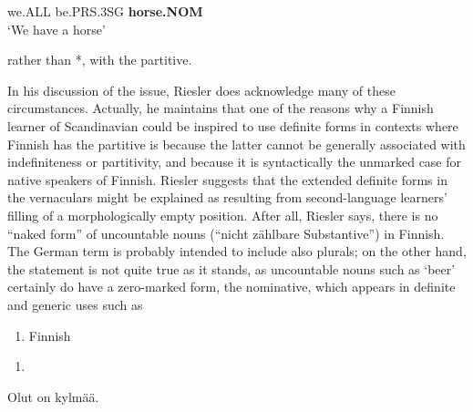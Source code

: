 we.ALL  be.PRS.3SG  \textbf{horse.NOM} \\ %


‘We have a horse’
\z


rather than *, with the partitive.

In his discussion of the issue, Riesler does acknowledge many of these circumstances. Actually, he maintains that one of the reasons why a Finnish learner of Scandinavian could be inspired to use definite forms in contexts where Finnish has the partitive is because the latter cannot be generally associated with indefiniteness or partitivity, and because it is syntactically the unmarked case for native speakers of Finnish. Riesler suggests that the extended definite forms in the vernaculars might be explained as resulting from second-language learners’ filling of a morphologically empty position. After all, Riesler says, there is no “naked form” of uncountable nouns (“nicht zählbare Substantive”) in Finnish. The German term is probably intended to include also plurals; on the other hand, the statement is not quite true as it stands, as uncountable nouns such as  ‘beer’ certainly do have a zero-marked form, the nominative, which appears in definite and generic uses such as

\begin{enumerate} %
\item 
Finnish

\end{enumerate} %
\setcounter{listLFOxcviiileveli}{0}
\begin{enumerate} %
\item 
\end{enumerate} %
\ea\label{}
\gll Olut  on\textsuperscript{  }kylmää.\\


